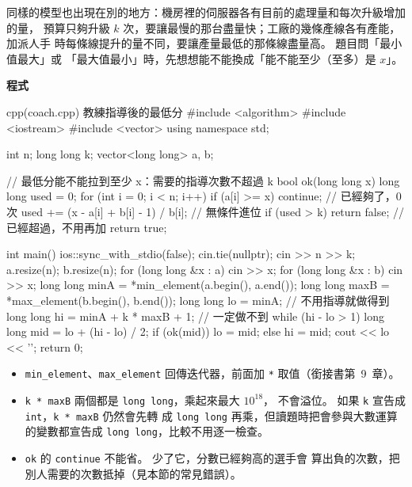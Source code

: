 同樣的模型也出現在別的地方：機房裡的伺服器各有目前的處理量和每次升級增加的量，
預算只夠升級 $k$ 次，要讓最慢的那台盡量快；工廠的幾條產線各有產能，加派人手
時每條線提升的量不同，要讓產量最低的那條線盡量高。 題目問「最小值最大」或
「最大值最小」時，先想想能不能換成「能不能至少（至多）是 $x$」。

\textbf{程式}

\begin{example}[label=ex:coach]{cpp}{(coach.cpp) 教練指導後的最低分}
#include <algorithm>
#include <iostream>
#include <vector>
using namespace std;

int n;
long long k;
vector<long long> a, b;

// 最低分能不能拉到至少 x：需要的指導次數不超過 k
bool ok(long long x) {
    long long used = 0;
    for (int i = 0; i < n; i++) {
        if (a[i] >= x) {
            continue;                           // 已經夠了，0 次
        }
        used += (x - a[i] + b[i] - 1) / b[i];   // 無條件進位
        if (used > k) {
            return false;                       // 已經超過，不用再加
        }
    }
    return true;
}

int main() {
    ios::sync_with_stdio(false);
    cin.tie(nullptr);
    cin >> n >> k;
    a.resize(n);
    b.resize(n);
    for (long long &x : a) {
        cin >> x;
    }
    for (long long &x : b) {
        cin >> x;
    }
    long long minA = *min_element(a.begin(), a.end());
    long long maxB = *max_element(b.begin(), b.end());
    long long lo = minA;                    // 不用指導就做得到
    long long hi = minA + k * maxB + 1;     // 一定做不到
    while (hi - lo > 1) {
        long long mid = lo + (hi - lo) / 2;
        if (ok(mid)) {
            lo = mid;
        } else {
            hi = mid;
        }
    }
    cout << lo << '\n';
    return 0;
}
\end{example}


\begin{itemize}
\item \texttt{min\_element}、\texttt{max\_element} 回傳迭代器，前面加
\texttt{*} 取值（銜接書第~9~章）。
\item \texttt{k * maxB} 兩個都是 \texttt{long long}，乘起來最大 $10^{18}$，
不會溢位。 如果 \texttt{k} 宣告成 \texttt{int}，\texttt{k * maxB} 仍然會先轉
成 \texttt{long long} 再乘，但讀題時把會參與大數運算的變數都宣告成
\texttt{long long}，比較不用逐一檢查。
\item \texttt{ok} 的 \texttt{continue} 不能省。 少了它，分數已經夠高的選手會
算出負的次數，把別人需要的次數抵掉（見本節的常見錯誤）。
\end{itemize}

